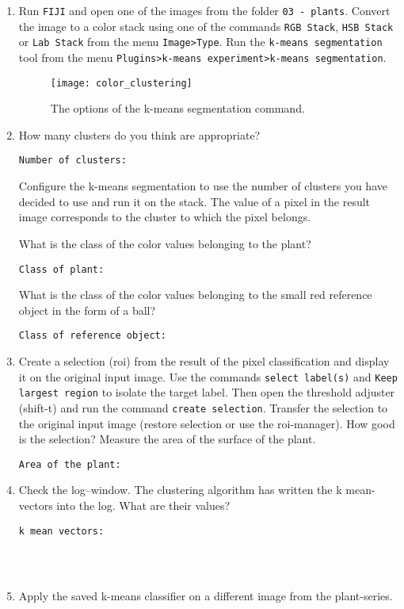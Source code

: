 \begin{enumerate}
\item Run {\tt FIJI} and open one of the images from the folder {\tt 03 - plants}. Convert the image to a color stack using one of the commands {\tt RGB Stack}, {\tt HSB Stack} or {\tt Lab Stack} from the menu {\tt Image>Type}.  Run the {\tt k-means segmentation} tool from the menu {\tt Plugins>k-means experiment>k-means segmentation}.
\begin{figure}[!htb]
 \centering
 \texttt{[image: color\_clustering]}
 \caption{The options of the k-means segmentation command.}
 \label{figure:color_clustering}
\end{figure}
\item How many clusters do you think are appropriate? 
\begin{verbatim}
Number of clusters:

\end{verbatim}
Configure the k-means segmentation to use the number of clusters you have decided to use and run it on the stack. The value of a pixel in the result image corresponds to the cluster to which the pixel belongs. 

What is the class of the color values belonging to the plant?
\begin{verbatim}
Class of plant:

\end{verbatim}
What is the class of the color values belonging to the small red reference object in the form of a ball?
\begin{verbatim}
Class of reference object:

\end{verbatim}

\item Create a selection (roi) from the result of the pixel classification and display it on the original input image. Use the commands {\tt select label(s)} and {\tt Keep largest region} to isolate the target label. Then open the threshold adjuster (shift-t) and run the command {\tt create selection}. Transfer the selection to the original input image (restore selection or use the roi-manager). How good is the selection? Measure the area of the surface of the plant.
\begin{verbatim}
Area of the plant:

\end{verbatim}
\item Check the log--window. The clustering algorithm has written the k mean-vectors into the log. What are their values?
\begin{verbatim}
k mean vectors:




\end{verbatim}

\item Apply the saved k-means classifier on a different image from the plant-series.
\end{enumerate}

